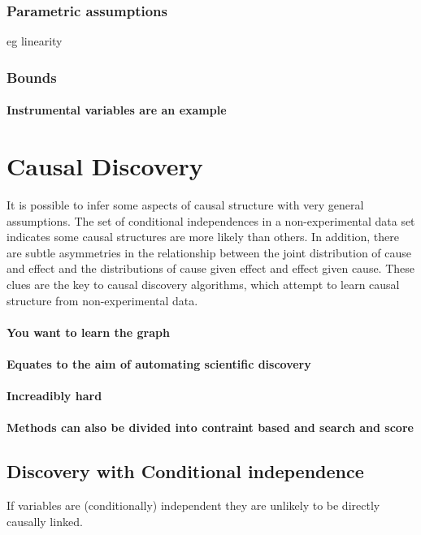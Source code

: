 \documentclass[11pt,a4paper,oneside]{book}
\begin{document}
\subsubsection*{Parametric assumptions}
eg linearity

\subsubsection*{Bounds}
\paragraph{Instrumental variables are an example}


\section*{Causal Discovery}
It is possible to infer some aspects of causal structure with very general assumptions. The set of conditional independences in a non-experimental data set indicates some causal structures are more likely than others. In addition, there are subtle asymmetries in the relationship between the joint distribution of cause and effect and the distributions of cause given effect and effect given cause. These clues are the key to causal discovery algorithms, which attempt to learn causal structure from non-experimental data. 

\paragraph*{You want to learn the graph}
\paragraph*{Equates to the aim of automating scientific discovery}
\paragraph*{Increadibly hard}
\paragraph*{Methods can also be divided into contraint based and search and score}
\subsection*{Discovery with Conditional independence}
If variables are (conditionally) independent they are unlikely to be directly causally linked. 
\end{document}
